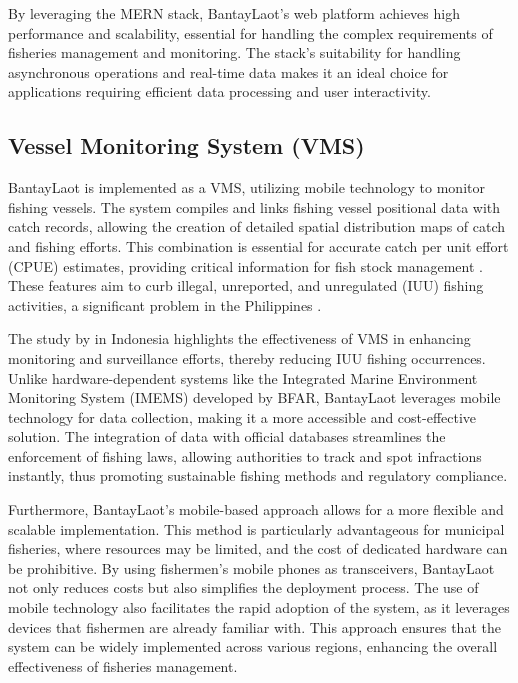 \documentclass{icsthesis}
\begin{document}
\begin{mainmatter}
            By leveraging the MERN stack, BantayLaot's web platform achieves high performance and scalability, essential for handling the complex requirements of fisheries management and monitoring. The stack's suitability for handling asynchronous operations and real-time data makes it an ideal choice for applications requiring efficient data processing and user interactivity.
            
            \subsection{Vessel Monitoring System (VMS)}
            BantayLaot is implemented as a VMS, utilizing mobile technology to monitor fishing vessels. The system compiles and links fishing vessel positional data with catch records, allowing the creation of detailed spatial distribution maps of catch and fishing efforts. This combination is essential for accurate catch per unit effort (CPUE) estimates, providing critical information for fish stock management \citep{Gerritsen2011}. These features aim to curb illegal, unreported, and unregulated (IUU) fishing activities, a significant problem in the Philippines \citep{Soemarmi2020}.
            
            The study by \citep{Soemarmi2020} in Indonesia highlights the effectiveness of VMS in enhancing monitoring and surveillance efforts, thereby reducing IUU fishing occurrences. Unlike hardware-dependent systems like the Integrated Marine Environment Monitoring System (IMEMS) developed by BFAR, BantayLaot leverages mobile technology for data collection, making it a more accessible and cost-effective solution. The integration of data with official databases streamlines the enforcement of fishing laws, allowing authorities to track and spot infractions instantly, thus promoting sustainable fishing methods and regulatory compliance.
            
            Furthermore, BantayLaot's mobile-based approach allows for a more flexible and scalable implementation. This method is particularly advantageous for municipal fisheries, where resources may be limited, and the cost of dedicated hardware can be prohibitive. By using fishermen's mobile phones as transceivers, BantayLaot not only reduces costs but also simplifies the deployment process. The use of mobile technology also facilitates the rapid adoption of the system, as it leverages devices that fishermen are already familiar with. This approach ensures that the system can be widely implemented across various regions, enhancing the overall effectiveness of fisheries management.
            

\end{mainmatter}
\end{document}
